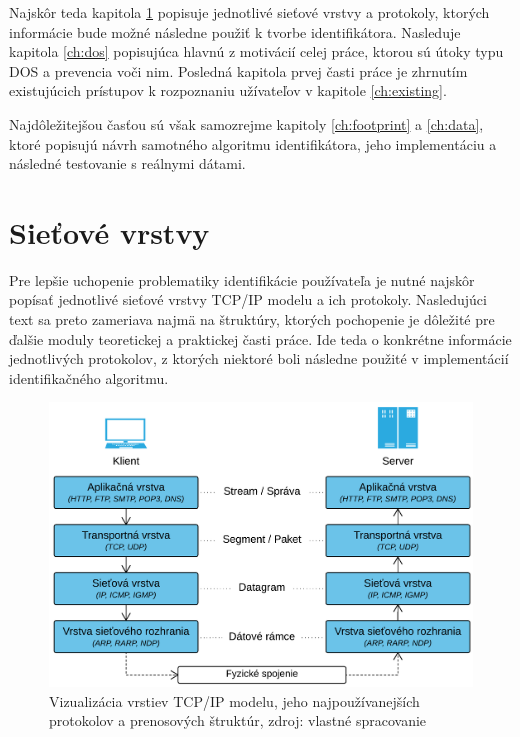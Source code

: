 \documentclass[
  printed, %
  table,   %
  lof,     %
  nolot,   %
  nocover
]{fithesis3}
\begin{document}
Najskôr teda kapitola
\ref{ch:net-layers} popisuje jednotlivé sieťové vrstvy a protokoly, ktorých
informácie bude možné následne použiť k tvorbe identifikátora. 
Nasleduje kapitola \ref{ch:dos} popisujúca hlavnú z motivácií 
celej práce, ktorou sú útoky typu DOS a prevencia voči nim.
Posledná kapitola prvej časti práce je zhrnutím
existujúcich prístupov k rozpoznaniu užívateľov v kapitole \ref{ch:existing}.

Najdôležitejšou časťou sú však
samozrejme kapitoly \ref{ch:footprint} a \ref{ch:data}, ktoré popisujú návrh samotného 
algoritmu identifikátora, jeho implementáciu a následné testovanie s reálnymi dátami.

\chapter{Sieťové vrstvy}
\label{ch:net-layers}
Pre lepšie uchopenie problematiky identifikácie používateľa je nutné najskôr
popísať jednotlivé sieťové vrstvy TCP/IP modelu a
ich protokoly. Nasledujúci text sa preto zameriava najmä na štruktúry, ktorých pochopenie je
dôležité pre ďalšie moduly teoretickej a praktickej časti práce. Ide teda o
konkrétne informácie jednotlivých protokolov, z ktorých niektoré boli následne použité v implementácií
identifikačného algoritmu.

\begin{figure}[h]
  \centering
    \includegraphics[width=\textwidth]{images/net-layers.png}
  \caption{Vizualizácia vrstiev TCP/IP modelu, jeho najpoužívanejších protokolov
  a prenosových štruktúr, zdroj: vlastné spracovanie}
  \label{fig:net-layers}
\end{figure}
\end{document}
